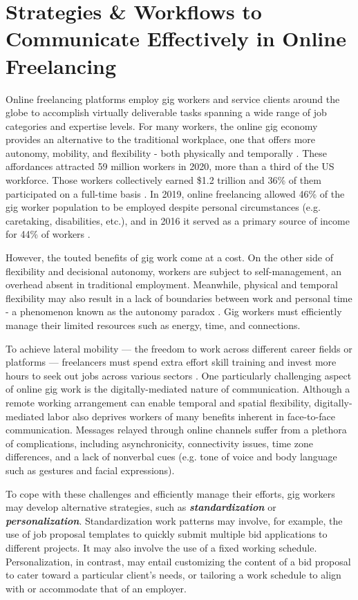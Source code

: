 \chapter{Strategies \& Workflows to Communicate Effectively in Online Freelancing} \label{freelance}

Online freelancing platforms employ gig workers and service clients around the globe to accomplish virtually deliverable tasks spanning a wide range of job categories and expertise levels. For many workers, the online gig economy provides an alternative to the traditional workplace, one that offers more autonomy, mobility, and flexibility - both physically and temporally \cite{dunn2017digital, boundary}. These affordances attracted 59 million workers in 2020, more than a third of the US workforce. Those workers collectively earned \$1.2 trillion and 36\% of them participated on a full-time basis \cite{freelance-forward}. In 2019, online freelancing allowed 46\% of the gig worker population to be employed despite personal circumstances (e.g. caretaking, disabilities, etc.), and in 2016 it served as a primary source of income for 44\% of workers \cite{manyika2016independent}. 

However, the touted benefits of gig work come at a cost. On the other side of flexibility and decisional autonomy, workers are subject to self-management, an overhead absent in traditional employment. Meanwhile, physical and temporal flexibility may also result in a lack of boundaries between work and personal time - a phenomenon known as the autonomy paradox \cite{Shevchuk_Strebkov_Davis_2019}. Gig workers must efficiently manage their limited resources such as energy, time, and connections.

To achieve lateral mobility --- the freedom to work across different career fields or platforms --- freelancers must spend extra effort skill training and invest more hours to seek out jobs across various sectors \cite{boundary}. One particularly challenging aspect of online gig work is the digitally-mediated nature of communication. Although a remote working arrangement can enable temporal and spatial flexibility, digitally-mediated labor also deprives workers of many benefits inherent in face-to-face communication. Messages relayed through online channels suffer from a plethora of complications, including asynchronicity, connectivity issues, time zone differences, and a lack of nonverbal cues (e.g. tone of voice and body language such as gestures and facial expressions). 

To cope with these challenges and efficiently manage their efforts, gig workers may develop alternative strategies, such as \textbf{\textit{standardization}} or \textbf{\textit{personalization}}. Standardization work patterns may involve, for example, the use of job proposal templates to quickly submit multiple bid applications to different projects. It may also involve the use of a fixed working schedule. Personalization, in contrast, may entail customizing the content of a bid proposal to cater toward a particular client's needs, or tailoring a work schedule to align with or accommodate that of an employer.

